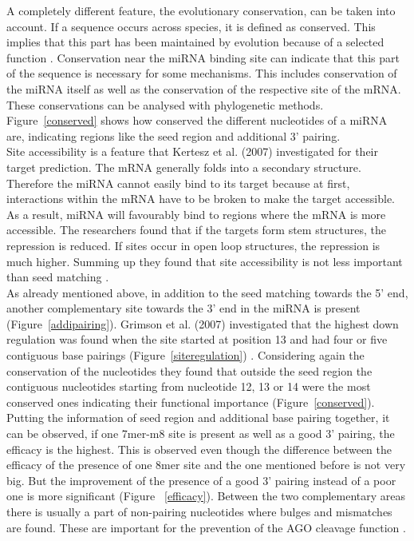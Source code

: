 \documentclass[12pt,  a4paper]{report}
\begin{document}
A completely different feature, the evolutionary conservation, can be taken into account. If a sequence occurs across species, it is defined as conserved. This implies that this part has been maintained by evolution because of a selected function \cite{Peterson}. Conservation near the miRNA binding site can indicate that this part of the sequence is necessary for some mechanisms. This includes conservation of the miRNA itself as well as the conservation of the respective site of the mRNA. These conservations can be analysed with phylogenetic methods. Figure~\ref{conserved} shows how conserved the different nucleotides of a miRNA are, indicating regions like the seed region and additional 3' pairing. \\

Site accessibility is a feature that Kertesz et al. (2007) investigated for their target prediction. The mRNA generally folds into a secondary structure. Therefore the miRNA cannot easily bind to its target because at first, interactions within the mRNA have to be broken to make the target accessible. As a result, miRNA will favourably bind to regions where the mRNA is more accessible. The researchers found that if the targets form stem structures, the repression is reduced. If sites occur in open loop structures, the repression is much higher. Summing up they found that site accessibility is not less important than seed matching \cite{Kertesz}. \\

As already mentioned above, in addition to the seed matching towards the 5' end, another complementary site towards the 3' end in the miRNA is present (Figure~\ref{addipairing}). Grimson et al. (2007) investigated that the highest down regulation was found when the site started at position 13 and had four or five contiguous base pairings (Figure~\ref{siteregulation}) \cite{Grimson}. Considering again the conservation of the nucleotides they found that outside the seed region the contiguous nucleotides starting from nucleotide 12, 13 or 14 were the most conserved ones indicating their functional importance (Figure~\ref{conserved}). Putting the information of seed region and additional base pairing together, it can be observed, if one 7mer-m8 site is present as well as a good 3' pairing, the efficacy is the highest. This is observed even though the difference between the efficacy of the presence of one 8mer site and the one mentioned before is not very big. But the improvement of the presence of a good 3' pairing instead of a poor one is more significant (Figure ~\ref{efficacy}). Between the two complementary areas there is usually a part of non-pairing nucleotides where bulges and mismatches are found. These are important for the prevention of the AGO cleavage function \cite{Filipowicz}.\\
\end{document}
